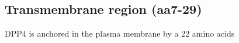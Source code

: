 \subsection{Transmembrane region (aa7-29)}

DPP4 is anchored in the plasma membrane by a 22 amino acids 